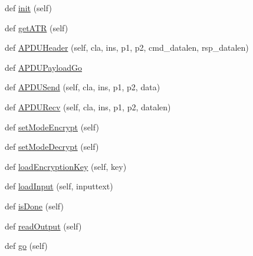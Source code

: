 \begin{DoxyCompactItemize}
\item 
def \hyperlink{classsoftware_1_1chipwhisperer_1_1capture_1_1scopes_1_1cwhardware_1_1ChipWhispererTargets_1_1CWSCardIntegrated_a7f14424999941893533baad1551b4d98}{init} (self)
\item 
def \hyperlink{classsoftware_1_1chipwhisperer_1_1capture_1_1scopes_1_1cwhardware_1_1ChipWhispererTargets_1_1CWSCardIntegrated_a50e04f7d5a3a55285b63e1c66eff530f}{get\+A\+T\+R} (self)
\item 
def \hyperlink{classsoftware_1_1chipwhisperer_1_1capture_1_1scopes_1_1cwhardware_1_1ChipWhispererTargets_1_1CWSCardIntegrated_aa8ea0b03efd00e48ad594c84efa31cb3}{A\+P\+D\+U\+Header} (self, cla, ins, p1, p2, cmd\+\_\+datalen, rsp\+\_\+datalen)
\item 
def \hyperlink{classsoftware_1_1chipwhisperer_1_1capture_1_1scopes_1_1cwhardware_1_1ChipWhispererTargets_1_1CWSCardIntegrated_affc817c48f2b38d8fc0c2a98a5398b1e}{A\+P\+D\+U\+Payload\+Go}
\item 
def \hyperlink{classsoftware_1_1chipwhisperer_1_1capture_1_1scopes_1_1cwhardware_1_1ChipWhispererTargets_1_1CWSCardIntegrated_aca4b5ed705dc9e44eedb655b28e392b3}{A\+P\+D\+U\+Send} (self, cla, ins, p1, p2, data)
\item 
def \hyperlink{classsoftware_1_1chipwhisperer_1_1capture_1_1scopes_1_1cwhardware_1_1ChipWhispererTargets_1_1CWSCardIntegrated_a9843497b169227000cf478d1bbcc030e}{A\+P\+D\+U\+Recv} (self, cla, ins, p1, p2, datalen)
\item 
def \hyperlink{classsoftware_1_1chipwhisperer_1_1capture_1_1scopes_1_1cwhardware_1_1ChipWhispererTargets_1_1CWSCardIntegrated_aa3fa4bb32d9b9568758c73bc1b4b5420}{set\+Mode\+Encrypt} (self)
\item 
def \hyperlink{classsoftware_1_1chipwhisperer_1_1capture_1_1scopes_1_1cwhardware_1_1ChipWhispererTargets_1_1CWSCardIntegrated_ac0753a055577e9ce9307f3d9c93f77d9}{set\+Mode\+Decrypt} (self)
\item 
def \hyperlink{classsoftware_1_1chipwhisperer_1_1capture_1_1scopes_1_1cwhardware_1_1ChipWhispererTargets_1_1CWSCardIntegrated_a5e9fc354c8a4ed9fbe30f1e51a8f5a6e}{load\+Encryption\+Key} (self, key)
\item 
def \hyperlink{classsoftware_1_1chipwhisperer_1_1capture_1_1scopes_1_1cwhardware_1_1ChipWhispererTargets_1_1CWSCardIntegrated_a73971491540b9fc4d387fcbac4d6ada7}{load\+Input} (self, inputtext)
\item 
def \hyperlink{classsoftware_1_1chipwhisperer_1_1capture_1_1scopes_1_1cwhardware_1_1ChipWhispererTargets_1_1CWSCardIntegrated_a5b76873034d47fd4597f0c7e6d199e8b}{is\+Done} (self)
\item 
def \hyperlink{classsoftware_1_1chipwhisperer_1_1capture_1_1scopes_1_1cwhardware_1_1ChipWhispererTargets_1_1CWSCardIntegrated_ad67f3fd261b5f76fda1b1456f34c3402}{read\+Output} (self)
\item 
def \hyperlink{classsoftware_1_1chipwhisperer_1_1capture_1_1scopes_1_1cwhardware_1_1ChipWhispererTargets_1_1CWSCardIntegrated_a5220e229e19ba67f1fcc9bafa20c6cd8}{go} (self)
\end{DoxyCompactItemize}
